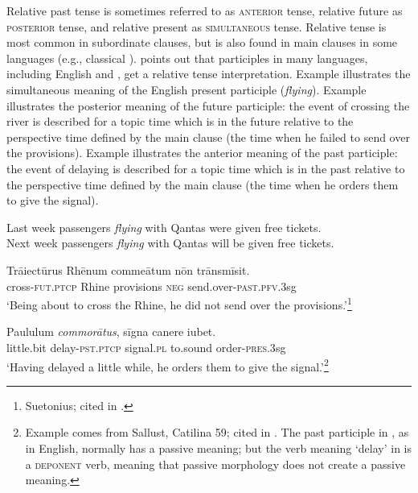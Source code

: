 Relative past tense is sometimes referred to as \textsc{anterior} tense, relative future as \textsc{posterior} tense, and relative present as \textsc{simultaneous} tense. Relative tense is most common in subordinate clauses, but is also found in main clauses in some languages (e.g., classical ). \citet{Comrie1985} points out that participles in many languages, including English and , get a relative tense interpretation. Example  illustrates the simultaneous meaning of the English present participle (\textit{flying}). Example  illustrates the posterior meaning of the  future participle: the event of crossing the river is described for a topic time which is in the future relative to the perspective time defined by the main clause (the time when he failed to send over the provisions). Example  illustrates the anterior meaning of the  past participle: the event of delaying is described for a topic time which is in the past relative to the perspective time defined by the main clause (the time when he orders them to give the signal).


\ea \label{ex:21.19}
\ea  Last week passengers \textit{flying} with Qantas were given free tickets.\\
\ex Next week passengers \textit{flying} with Qantas will be given free tickets.
                       \z
\z

\ea \label{ex:21.20}
\gll Trāiectūrus  Rhēnum  commeātum  nōn  trānsmīsit.\\
cross-\textsc{fut.ptcp}  Rhine  provisions  \textsc{neg}  send.over-\textsc{past.pfv.3}sg\\
\glt ‘Being about to cross the Rhine, he did not send over the provisions.’\footnote{Suetonius; cited in \citet[61]{Comrie1985}.} \\

\z

\ea \label{ex:21.21}
\gll Paululum  \textit{commorātus},  sīgna  canere  iubet.\\
little.bit  delay-\textsc{pst.ptcp}  signal.\textsc{pl}  to.sound  order-\textsc{pres.3}sg\\
\glt ‘Having delayed a little while, he orders them to give the signal.’\footnote{Example  comes from Sallust, Catilina 59; cited in \citet[§496]{AllenGreenough1903}. The past participle in , as in English, normally has a passive meaning; but the verb meaning ‘delay’ in  is a \textsc{deponent} verb, meaning that passive morphology does not create a passive meaning.}\\

